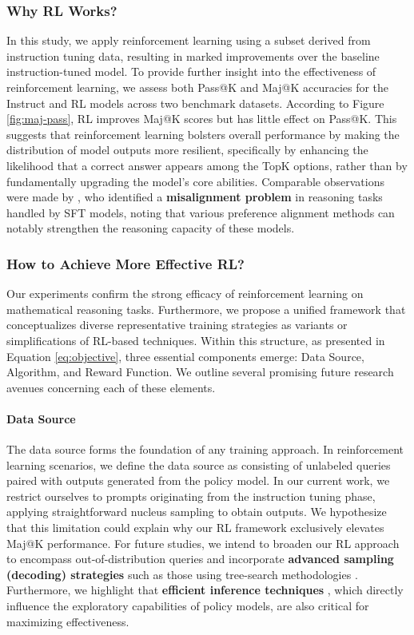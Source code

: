 \subsubsection{Why RL Works?} In this study, we apply reinforcement learning using a subset derived from instruction tuning data, resulting in marked improvements over the baseline instruction-tuned model. To provide further insight into the effectiveness of reinforcement learning, we assess both Pass@K and Maj@K accuracies for the Instruct and RL models across two benchmark datasets. According to Figure \ref{fig:maj-pass}, RL improves Maj@K scores but has little effect on Pass@K. This suggests that reinforcement learning bolsters overall performance by making the distribution of model outputs more resilient, specifically by enhancing the likelihood that a correct answer appears among the TopK options, rather than by fundamentally upgrading the model’s core abilities. Comparable observations were made by \citep{wang2023making}, who identified a \textbf{misalignment problem} in reasoning tasks handled by SFT models, noting that various preference alignment methods \citep{yuan2023rrhf,song2023preference,wang2023making} can notably strengthen the reasoning capacity of these models.

\subsubsection{How to Achieve More Effective RL?}
\label{sec:effec_rl}
Our experiments confirm the strong efficacy of reinforcement learning on mathematical reasoning tasks. Furthermore, we propose a unified framework that conceptualizes diverse representative training strategies as variants or simplifications of RL-based techniques. Within this structure, as presented in Equation \ref{eq:objective}, three essential components emerge: Data Source, Algorithm, and Reward Function. We outline several promising future research avenues concerning each of these elements.

\paragraph{Data Source} The data source forms the foundation of any training approach. In reinforcement learning scenarios, we define the data source as consisting of unlabeled queries paired with outputs generated from the policy model. In our current work, we restrict ourselves to prompts originating from the instruction tuning phase, applying straightforward nucleus sampling to obtain outputs. We hypothesize that this limitation could explain why our RL framework exclusively elevates Maj@K performance. For future studies, we intend to broaden our RL approach to encompass out-of-distribution queries and incorporate \textbf{advanced sampling (decoding) strategies} such as those using tree-search methodologies \citep{yao2023tree}. Furthermore, we highlight that \textbf{efficient inference techniques} \citep{xia-etal-2023-speculative,leviathan2023fast,kwon2023efficient,xia2024unlocking}, which directly influence the exploratory capabilities of policy models, are also critical for maximizing effectiveness.

